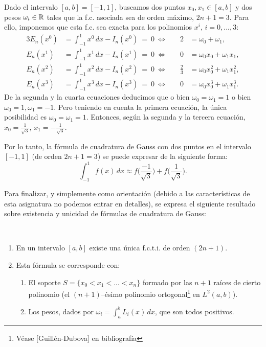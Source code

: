 \begin{example}
  Dado el intervalo $[a,b]=[-1,1]$, buscamos dos puntos $x_0,x_1\in
  [a,b]$ y dos pesos $\omega_i\in\operatorname{{\mathbb R}}$ tales que la f.c. asociada sea
  de orden máximo, $2n+1=3$. Para ello, imponemos que esta f.c. sea exacta
  para los polinomios $x^i$, $i=0,...,3$:
  \begin{alignat*}{3}
    E_n(x^0)&=\int_{-1}^1 x^0\, dx - I_n(x^0)\ =\ 0 \ \Leftrightarrow
    \quad & 2 &= \omega_0+\omega_1,\\
    E_n(x^1)&=\int_{-1}^1 x^1\, dx - I_n(x^1)\ =\ 0 \ \Leftrightarrow
    \quad & 0 &=  \omega_0x_0+\omega_1x_1,\\
    E_n(x^2)&=\int_{-1}^1 x^2\, dx - I_n(x^2)\ =\ 0 \ \Leftrightarrow
    \quad & \frac{2}{3} &= \omega_0x_0^2+\omega_1x_1^2,\\
    E_n(x^3)&=\int_{-1}^1 x^3\, dx - I_n(x^3)\ =\ 0 \ \Leftrightarrow
    \quad &0 &=
    \omega_0x_0^3+\omega_1x_1^3.
  \end{alignat*}
  De la segunda y la cuarta ecuaciones deducimos que o bien
  $\omega_0=\omega_1=1$ o bien $\omega_0=1, \omega_1=-1$.
  Pero teniendo en cuenta la primera ecuación, la única posibilidad es
  $\omega_0=\omega_1=1$. Entonces, según la segunda y la tercera ecuación,
  $x_0=\frac{1}{\sqrt 3}$, $x_1=-\frac{1}{\sqrt 3}$.

  Por lo tanto, la fórmula de cuadratura de Gauss con dos puntos en el
  intervalo $[-1,1]$ (de orden $2n+1=3$) se puede expresar de la
  siguiente forma:
  \begin{equation*}
    \int_{-1}^1 f(x)\, dx \approx f\Big( \frac{-1}{\sqrt 3} \Big)
    + f\Big(\frac{1}{\sqrt 3}\Big).
  \end{equation*}
\end{example}


Para finalizar, y simplemente como orientación (debido a las
características de esta asignatura no podemos entrar en detalles), se
expresa el siguiente resultado sobre existencia y unicidad de fórmulas
de cuadratura de Gauss:
\begin{theorem}~
  \begin{enumerate}
  \item En un intervalo $[a,b]$ existe una única f.c.t.i. de orden $(2n+1)$.
  \item Esta fórmula se corresponde con:
    \begin{enumerate}
    \item El soporte $S=\{x_0<x_1<...<x_n\}$ formado por las $n+1$
      raíces de cierto polinomio (el $(n+1)$--ésimo polinomio
      ortogonal\footnote{Véase [Guillén-Dubova] en bibliografía} en $L^2(a,b)$).
    \item Los pesos, dados por $\omega_i=\int_a^b L_i(x)\, dx$, que son
      todos positivos.
    \end{enumerate}
  \end{enumerate}
\end{theorem}



